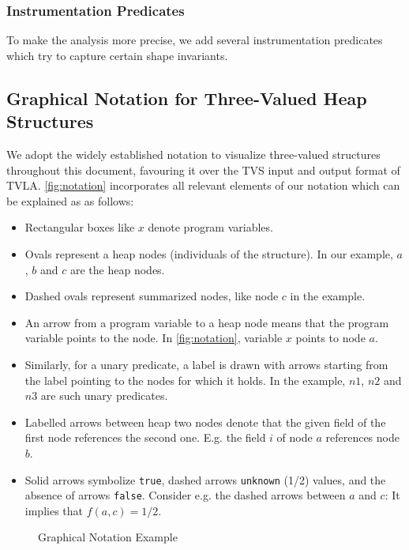 \documentclass[11pt,a4paper,english]{article}
\begin{document}
\subsubsection{Instrumentation Predicates}
To make the analysis more precise, we add several instrumentation predicates
which try to capture certain shape invariants. 

\subsection{Graphical Notation for Three-Valued Heap Structures}
\label{sct:notation}
We adopt the widely established notation to visualize three-valued structures
throughout this document, favouring it over the TVS input and output format of
TVLA. \autoref{fig:notation} incorporates all relevant elements of our notation
which can be explained as  as follows:
\begin{itemize}
  \item Rectangular boxes like $x$ denote program variables.
  \item Ovals represent a heap nodes (individuals of the structure). In our
    example, $a$, $b$ and $c$ are the heap nodes.
  \item Dashed ovals represent summarized nodes, like node $c$ in the example. 
  \item An arrow from a program variable to a heap node means that the
    program variable points to the node. In \autoref{fig:notation}, variable $x$
    points to node $a$.
  \item Similarly, for a unary predicate, a label is drawn with arrows starting
    from the label pointing to the nodes for which it holds. In the example,
    $n1$, $n2$ and $n3$ are such unary predicates.
  \item Labelled arrows between heap two nodes denote that the given field of
    the  first node references the second one. E.g. the field $i$ of node $a$
    references node $b$. 
  \item Solid arrows symbolize \texttt{true}, dashed arrows \texttt{unknown}
    (1/2)  values, and the absence of arrows \texttt{false}. Consider e.g. the
    dashed arrows between $a$ and $c$: It implies that $f(a,c) = 1/2$.
\end{itemize}
\begin{figure}
\centering
{}
\caption{Graphical Notation Example}
\label{fig:notation}
\end{figure}
\end{document}
